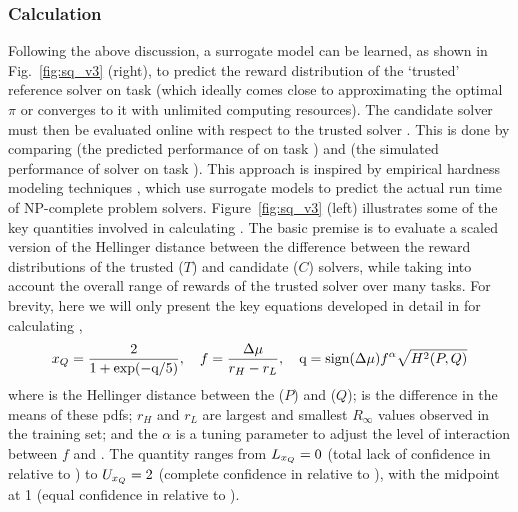 \subsubsection{Calculation} \label{sec:methodology}
Following the above discussion, a surrogate model \surrogate{} can be learned,  as shown in Fig.~\ref{fig:sq_v3} (right), to predict the reward distribution \rwdtrustapprox{} of the `trusted' reference solver \solvetrust{} on task \task{} (which ideally comes close to approximating the optimal $\pi$ or converges to it with unlimited computing resources). The candidate solver \solve{} must then be evaluated online with respect to the trusted solver \solvetrust{}. This is done by comparing \rwdtrustapprox{} (the predicted performance of \solvetrust{} on task \task) and \rwd{} (the simulated performance of solver \solve{} on task \task). %
This approach is inspired by empirical hardness modeling techniques \cite{Leyton-Brown2009-yr}, which use surrogate models to predict the actual run time of NP-complete problem solvers. 
Figure~\ref{fig:sq_v3} (left) illustrates some of the key quantities involved in calculating \xQ{}. The basic premise is to evaluate a scaled version of the Hellinger distance between the difference between the reward distributions of the trusted ($T$) and candidate ($C$) solvers, while taking into account the overall range of rewards of the trusted solver over many tasks. %
For brevity, here we will only present the key equations developed in detail in \cite{Israelsen2018-qz} for calculating \xQ{}, 
\begin{align}
    x_{Q} = \frac{2}{1+\exp(-\text{q}/5)}, \ \ \
    f = \frac{\dmu}{r_H - r_L}, \ \ \
    \text{q} = \text{sign}(\dmu)f^{\alpha}\sqrt{\hellmet} \label{eq:SQ} %
\end{align}
where \hellmet{} is the Hellinger distance between the \rwdtrust{} ($P$) and \rwdcand{} ($Q$); \dmu{} is the difference in the means of these pdfs; %
$r_H$ and $r_L$ are largest and smallest $R_{\infty}$ values observed in the \solvetrust{} training set; and the $\alpha$ is a tuning parameter to adjust the level of interaction between $f$ and \hell{}. The quantity \xQ{} ranges from $L_{x_Q} = 0$ (total lack of confidence in \solve{} relative to \solvetrust{}) to $U_{x_Q}=2$ (complete confidence in \solve{} relative to \solvetrust{}), with the midpoint at 1 (equal confidence in \solve{} relative to \solvetrust{}). 
